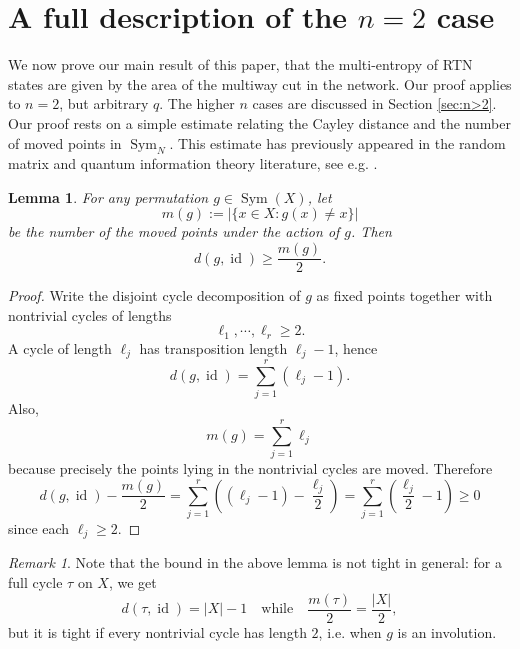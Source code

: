 \documentclass[11pt,oneside,letterpaper]{article}
\numberwithin{equation}{section}
\newtheorem{lemma}[theorem]{Lemma}
\theoremstyle{definition}
\theoremstyle{remark}
\newtheorem{remark}[theorem]{Remark}
\DeclareMathOperator{\id}{id}
\DeclareMathOperator{\Sym}{Sym}
\begin{document}
\section{A full description of the \texorpdfstring{$n=2$}{n=2} case}
\label{sec:n=2}
We now prove our main result of this paper, that the multi-entropy of RTN states are given by the area of the multiway cut in the network. Our proof applies to $n=2$, but arbitrary $q$. The higher $n$ cases are discussed in Section \ref{sec:n>2}.
Our proof rests on a simple estimate relating the Cayley distance and the number of moved points in $\Sym_N$. This estimate has previously appeared in the random matrix and quantum information theory literature, see e.g. \cite{biane1998representations,collins2011gaussianization, collins2013low}.
\begin{lemma}
  \label{lem:m(g)}
  For any permutation $g\in \Sym(X)$, let
  \begin{equation}
    m(g) := |\{x\in X: g(x) \ne x\}|
  \end{equation}
  be the number of the moved points under the action of $g$. Then
  \begin{equation}
    d(g,\id)\ge\frac{m(g)}{2}.
  \end{equation}
\end{lemma}
\begin{proof}
  Write the disjoint cycle decomposition of $g$ as fixed points together with nontrivial cycles of lengths
  \begin{equation}
    \ell_1,\cdots,\ell_r\ge 2.
  \end{equation}
  A cycle of length $\ell_j$ has transposition length $\ell_j-1$, hence
  \begin{equation}
    d(g,\id) = \sum_{j=1}^r(\ell_j-1).
  \end{equation}
  Also,
  \begin{equation}
    m(g) = \sum_{j=1}^r \ell_j
  \end{equation}
  because precisely the points lying in the nontrivial cycles are moved. Therefore
  \begin{equation}
    d(g,\id) -\frac{m(g)}{2} = \sum_{j=1}^r \left((\ell_j-1)-\frac{\ell_j}{2}\right) = \sum^r_{j=1} \left(\frac{\ell_j}{2}-1\right) \ge 0
  \end{equation}
  since each $\ell_j\ge2$.
\end{proof}
\begin{remark}
  \label{rem:m(g)}
  Note that the bound in the above lemma is not tight in general: for a full cycle $\tau$ on $X$, we get
  \begin{equation}
    d(\tau,\id) = |X|-1 \quad \text{while}\quad \frac{m(\tau)}{2} = \frac{|X|}{2},
  \end{equation}
  but it is tight if every nontrivial cycle has length $2$, i.e. when $g$ is an involution.
\end{remark}
\end{document}
